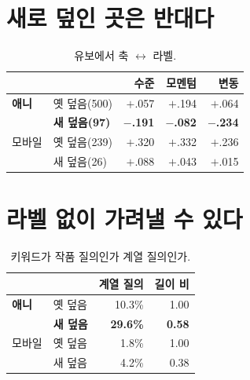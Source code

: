 \documentclass[10pt]{article}
\begin{document}
\section{새로 덮인 곳은 반대다}

\begin{table}[t]
\centering\tsize
\caption{유보에서 축 $\leftrightarrow$ 라벨.}
\begin{tabular}{llrrr}
\toprule
& & 수준 & 모멘텀 & 변동 \\
\midrule
\textbf{애니} & 옛 덮음(500) & $+$.057 & $+$.194 & $+$.064 \\
& \textbf{새 덮음(97)} & \textbf{$-$.191} & \textbf{$-$.082} & \textbf{$-$.234} \\
\midrule
모바일 & 옛 덮음(239) & $+$.320 & $+$.332 & $+$.236 \\
& 새 덮음(26) & $+$.088 & $+$.043 & $+$.015 \\
\bottomrule
\end{tabular}
\end{table}


\section{라벨 없이 가려낼 수 있다}

\begin{table}[t]
\centering\tsize
\caption{키워드가 작품 질의인가 계열 질의인가.}
\begin{tabular}{llrr}
\toprule
& & 계열 질의 & 길이 비 \\
\midrule
\textbf{애니} & 옛 덮음 & 10.3\% & 1.00 \\
& \textbf{새 덮음} & \textbf{29.6\%} & \textbf{0.58} \\
모바일 & 옛 덮음 & 1.8\% & 1.00 \\
& 새 덮음 & 4.2\% & 0.38 \\
\bottomrule
\end{tabular}
\end{table}

\end{document}

